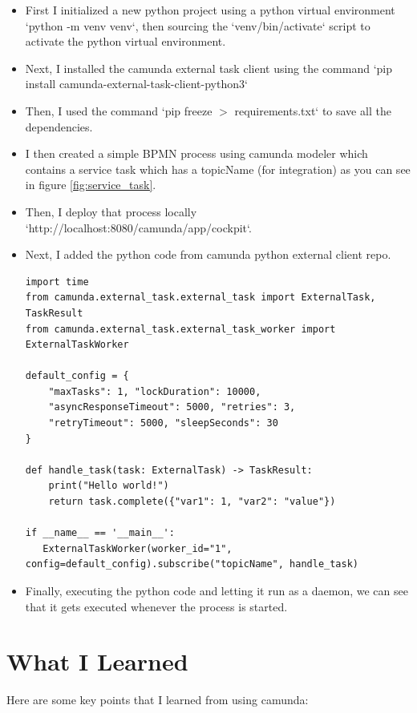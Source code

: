 \documentclass[12pt]{article}
\begin{document}
{  \begin{itemize}[noitemsep,nolistsep]
    \item First I initialized a new python project using a python virtual environment `python -m venv venv`, then sourcing the `venv/bin/activate` script to activate the python virtual environment.
    \item Next, I installed the camunda external task client using the command `pip install camunda-external-task-client-python3`
    \item Then, I used the command `pip freeze $ > $ requirements.txt` to save all the dependencies.
    \item I then created a simple BPMN process using camunda modeler which contains a service task which has a topicName (for integration) as you can see in figure \ref{fig:service_task}.
    \item Then, I deploy that process locally `http://localhost:8080/camunda/app/cockpit`.
   
    \item Next, I added the python code from camunda python external client repo.
\begin{lstlisting}
import time
from camunda.external_task.external_task import ExternalTask, TaskResult
from camunda.external_task.external_task_worker import ExternalTaskWorker

default_config = {
    "maxTasks": 1, "lockDuration": 10000,
    "asyncResponseTimeout": 5000, "retries": 3,
    "retryTimeout": 5000, "sleepSeconds": 30
}

def handle_task(task: ExternalTask) -> TaskResult:
    print("Hello world!")
    return task.complete({"var1": 1, "var2": "value"}) 

if __name__ == '__main__':
   ExternalTaskWorker(worker_id="1", config=default_config).subscribe("topicName", handle_task)
\end{lstlisting}

    \item Finally, executing the python code and letting it run as a daemon, we can see that it gets executed whenever the process is started.
  \end{itemize}

  \section{What I Learned}

  Here are some key points that I learned from using camunda:

}
\end{document}
